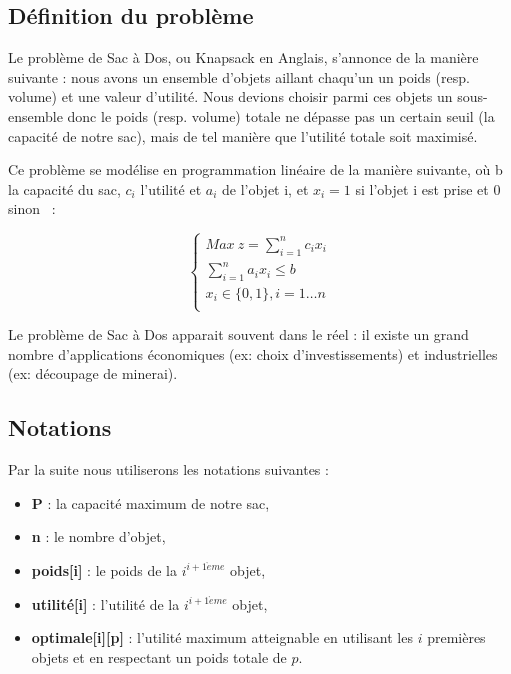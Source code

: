 \subsection{Définition du problème}

Le problème de Sac à Dos, ou \og Knapsack \fg{} en Anglais, s'annonce de la manière suivante : nous avons un ensemble d'objets aillant chaqu'un un poids (resp. volume) et une valeur d'utilité. Nous devions choisir parmi ces objets un sous-ensemble donc le poids (resp. volume) totale ne dépasse pas un certain seuil (la capacité de notre sac), mais de tel manière que l'utilité totale soit maximisé.

Ce problème se modélise en programmation linéaire de la
manière suivante, où b la capacité du sac, $c_i$ l'utilité et $a_i$ de l'objet i, et $x_i = 1$ si l'objet i est prise et $0$ sinon ~:

\begin{equation}
\begin{cases}
Max~z=\sum_{i=1}^nc_ix_i \\
\sum_{i=1}^na_ix_i \leq b \\
x_i \in\{0, 1\}, i=1\dots n\\
\end{cases}
\end{equation}

Le problème de Sac à Dos apparait souvent dans le réel : il existe un grand nombre d'applications économiques (ex: choix d'investissements) et industrielles (ex: découpage de minerai).

\subsection{Notations}

Par la suite nous utiliserons les notations suivantes :

\begin{itemize}
\item \textbf{P} : la capacité maximum de notre sac,
\item \textbf{n} : le nombre d'objet,
\item \textbf{poids[i]} : le poids de la $i^{i+1\grave{e}me}$ objet,
\item \textbf{utilité[i]} : l'utilité de la $i^{i+1\grave{e}me}$ objet,
\item \textbf{optimale[i][p]} : l'utilité maximum atteignable en utilisant les $i$ premières objets et en respectant un poids totale de $p$.
\end{itemize} 

